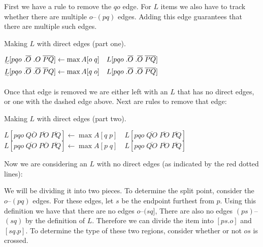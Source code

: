First we have a rule to remove the $qo$ edge.
For $L$ items we also have to track whether there are multiple $o$--$(pq)$ edges.
Adding this edge guarantees that there are multiple such edges.

\begin{finalEquation}
\caption{Making $L$ with direct edges (part one).}
  $\uwave{L}[pqo \; .\overline{O} \; .O \; \overline{PQ}] \leftarrow \max A[o \; q] \quad L[pqo \; .\overline{O} \; .\overline{O} \; \overline{PQ}]$ \\
  $\uwave{L}[pqo \; .\overline{O} \; .\overline{O} \; \overline{P}Q] \leftarrow \max A[q \; o] \quad L[pqo \; .\overline{O} \; .\overline{O} \; \overline{PQ}]$
\end{finalEquation}

Once that edge is removed we are either left with an $L$ that has no direct edges, or one with the dashed edge above.
Next are rules to remove that edge:

\begin{finalEquation}
\caption{Making $L$ with direct edges (part two).}
  $L[pqo \; Q\overline{O} \; \overline{PO} \; \overline{PQ}] \leftarrow \max A[q \; p] \quad L[pqo \; \overline{QO} \; \overline{PO} \; \overline{PQ}]$ \\
  $L[pqo \; \overline{QO} \; P\overline{O} \; \overline{PQ}] \leftarrow \max A[p \; q] \quad L[pqo \; \overline{QO} \; \overline{PO} \; \overline{PQ}]$
\end{finalEquation}

Now we are considering an $L$ with no direct edges (as indicated by the red dotted lines):

\begin{center}
\end{center}

We will be dividing it into two pieces.
To determine the split point, consider the $o$--$(pq)$ edges.
For these edges, let $s$ be the endpoint furthest from $p$.
Using this definition we have that there are no edges $o$--$(sq]$, 
There are also no edges $(ps)$--$(sq)$ by the definition of $L$.
Therefore we can divide the item into $[ps.o]$ and $[sq.p]$.
To determine the type of these two regions, consider whether or not $os$ is crossed.

